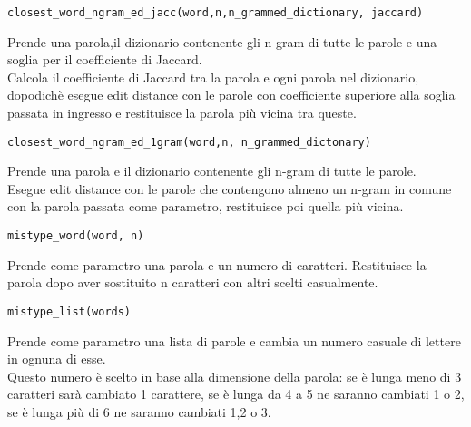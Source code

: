 \documentclass[]{article}
\begin{document}
\begin{verbatim}
closest_word_ngram_ed_jacc(word,n,n_grammed_dictionary, jaccard)
\end{verbatim}
Prende una parola,il dizionario contenente gli n-gram di tutte le parole e una soglia per il coefficiente di Jaccard.\\
Calcola il coefficiente di Jaccard tra la parola e ogni parola nel dizionario, dopodichè esegue edit distance con le parole con coefficiente superiore alla soglia passata in ingresso e restituisce la parola più vicina tra queste.\\
\begin{verbatim}
closest_word_ngram_ed_1gram(word,n, n_grammed_dictonary)
\end{verbatim}
Prende una parola e il dizionario contenente gli n-gram di tutte le parole.\\
Esegue edit distance con le parole che contengono almeno un n-gram in comune con la parola passata come parametro, restituisce poi quella più vicina.

\begin{verbatim}
mistype_word(word, n)
\end{verbatim}
Prende come parametro una parola e un numero di caratteri. Restituisce la parola dopo aver sostituito n caratteri con altri scelti casualmente.

\begin{verbatim}
mistype_list(words)
\end{verbatim}
Prende come parametro una lista di parole e cambia un numero casuale di lettere in ognuna di esse.\\ Questo numero è scelto in base alla dimensione della parola: se è lunga meno di 3 caratteri sarà cambiato 1 carattere, se è lunga da 4 a 5 ne saranno cambiati 1 o 2, se è lunga più di 6 ne saranno cambiati 1,2 o 3.\\
\end{document}
